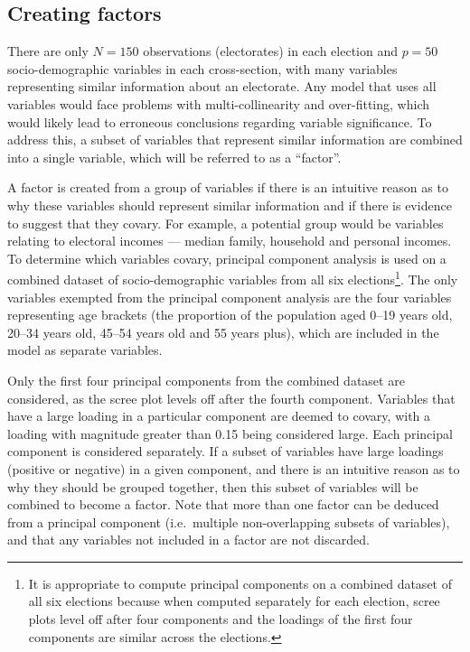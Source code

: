 \documentclass[times, doublespace]{anzsauth}
\let\rmarkdownfootnote\footnote%
\def\footnote{\protect\rmarkdownfootnote}
\begin{document}
\hypertarget{creating-factors}{%
\subsection{Creating factors}\label{creating-factors}}

There are only \(N = 150\) observations (electorates) in each election and \(p = 50\) socio-demographic variables in each cross-section, with many variables representing similar information about an electorate. Any model that uses all variables would face problems with multi-collinearity and over-fitting, which would likely lead to erroneous conclusions regarding variable significance. To address this, a subset of variables that represent similar information are combined into a single variable, which will be referred to as a ``factor''.

A factor is created from a group of variables if there is an intuitive reason as to why these variables should represent similar information and if there is evidence to suggest that they covary. For example, a potential group would be variables relating to electoral incomes --- median family, household and personal incomes. To determine which variables covary, principal component analysis is used on a combined dataset of socio-demographic variables from all six elections\footnote{It is appropriate to compute principal components on a combined dataset of all six elections because when computed separately for each election, scree plots level off after four components and the loadings of the first four components are similar across the elections.}. The only variables exempted from the principal component analysis are the four variables representing age brackets (the proportion of the population aged 0--19 years old, 20--34 years old, 45--54 years old and 55 years plus), which are included in the model as separate variables.

Only the first four principal components from the combined dataset are considered, as the scree plot levels off after the fourth component. Variables that have a large loading in a particular component are deemed to covary, with a loading with magnitude greater than 0.15 being considered large. Each principal component is considered separately. If a subset of variables have large loadings (positive or negative) in a given component, and there is an intuitive reason as to why they should be grouped together, then this subset of variables will be combined to become a factor. Note that more than one factor can be deduced from a principal component (i.e.~multiple non-overlapping subsets of variables), and that any variables not included in a factor are not discarded.
\end{document}
